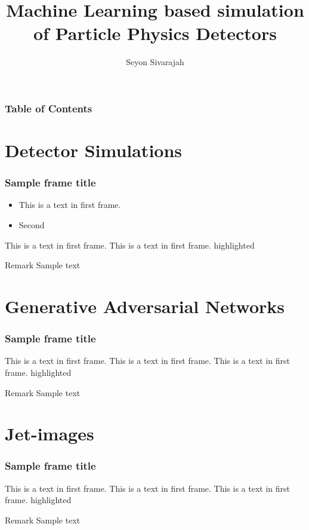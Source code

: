 \documentclass{beamer}
\title{Machine Learning based simulation of Particle Physics Detectors}
\author{Seyon Sivarajah}
\date{\displaydate{date}}
\begin{document}
	
	\frame{\titlepage}
	\begin{frame}
		\frametitle{Table of Contents}
		\tableofcontents
	\end{frame}
	
	\section{Detector Simulations}
	\label{sec:detsims}
	
		\begin{frame}
			\frametitle{Sample frame title}
			\begin{itemize}
				\item<1->
				This is a text in first frame.
				\item<2->
				Second
			\end{itemize}
			 This is a text in first frame. This is a text in first frame. \alert{highlighted} 
			\begin{block}{Remark}
				Sample text
			\end{block}
		\end{frame}
	
	\section{Generative Adversarial Networks}
	\label{sec:gans}
		\begin{frame}
		\frametitle{Sample frame title}
		This is a text in first frame. This is a text in first frame. This is a text in first frame. \alert{highlighted} 
		\begin{block}{Remark}
			Sample text
		\end{block}
		\end{frame}

	\section{Jet-images}
	\label{sec:jetims}
		\begin{frame}
			\frametitle{Sample frame title}
			This is a text in first frame. This is a text in first frame. This is a text in first frame. \alert{highlighted} 
			\begin{block}{Remark}
				Sample text
			\end{block}
		\end{frame}
	
	
	
	

	
	
	
\end{document}
